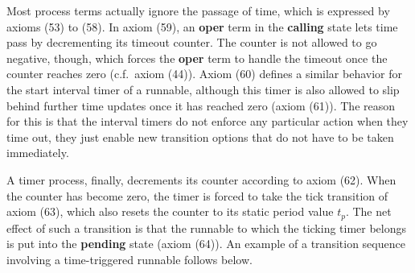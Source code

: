 \documentclass[twocolumn]{article}
\begin{document}
Most process terms actually ignore the passage of time, which is expressed by axioms (53) to (58). In axiom (59), an {\bf oper} term in the {\bf calling} state lets time pass by decrementing its timeout counter. The counter is not allowed to go negative, though, which forces the {\bf oper} term to handle the timeout once the counter reaches zero (c.f.\ axiom (44)). Axiom (60) defines a similar behavior for the start interval timer of a runnable, although this timer is also allowed to slip behind further time updates once it has reached zero (axiom (61)). The reason for this is that the interval timers do not enforce any particular action when they time out, they just enable new transition options that do not have to be taken immediately.

A timer process, finally, decrements its counter according to axiom (62). When the counter has become zero, the timer is forced to take the tick transition of axiom (63), which also resets the counter to its static period value $t_p$. The net effect of such a transition is that the runnable to which the ticking timer belongs is put into the {\bf pending} state (axiom (64)). An example of a transition sequence involving a time-triggered runnable follows below.
\end{document}
